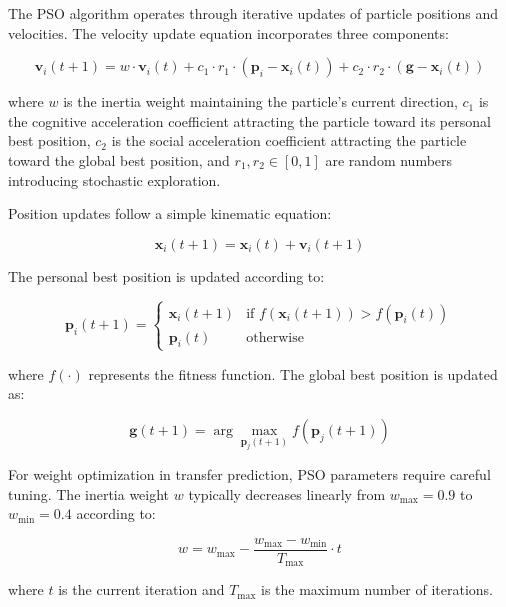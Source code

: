 The PSO algorithm operates through iterative updates of particle positions and velocities. The velocity update equation incorporates three components:

\begin{equation}
\mathbf{v}_i(t+1) = w \cdot \mathbf{v}_i(t) + c_1 \cdot r_1 \cdot (\mathbf{p}_i - \mathbf{x}_i(t)) + c_2 \cdot r_2 \cdot (\mathbf{g} - \mathbf{x}_i(t))
\end{equation}

where $w$ is the inertia weight maintaining the particle's current direction, $c_1$ is the cognitive acceleration coefficient attracting the particle toward its personal best position, $c_2$ is the social acceleration coefficient attracting the particle toward the global best position, and $r_1, r_2 \in [0,1]$ are random numbers introducing stochastic exploration.

Position updates follow a simple kinematic equation:

\begin{equation}
\mathbf{x}_i(t+1) = \mathbf{x}_i(t) + \mathbf{v}_i(t+1)
\end{equation}

The personal best position is updated according to:

\begin{equation}
\mathbf{p}_i(t+1) = \begin{cases}
\mathbf{x}_i(t+1) & \text{if } f(\mathbf{x}_i(t+1)) > f(\mathbf{p}_i(t)) \\
\mathbf{p}_i(t) & \text{otherwise}
\end{cases}
\end{equation}

where $f(\cdot)$ represents the fitness function. The global best position is updated as:

\begin{equation}
\mathbf{g}(t+1) = \arg\max_{\mathbf{p}_j(t+1)} f(\mathbf{p}_j(t+1))
\end{equation}

For weight optimization in transfer prediction, PSO parameters require careful tuning. The inertia weight $w$ typically decreases linearly from $w_{\text{max}} = 0.9$ to $w_{\text{min}} = 0.4$ according to:

\begin{equation}
w = w_{\text{max}} - \frac{w_{\text{max}} - w_{\text{min}}}{T_{\text{max}}} \cdot t
\end{equation}

where $t$ is the current iteration and $T_{\text{max}}$ is the maximum number of iterations.

